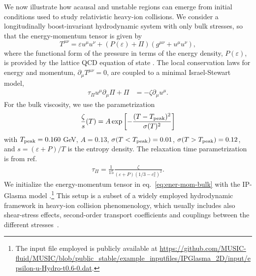 \documentclass[aps, prd, showkeys,superscriptaddress, nofootinbib,floatfix]{revtex4-2}
\begin{document}
We now illustrate how acausal and unstable regions can emerge from initial conditions used to study relativistic heavy-ion collisions.
We consider a longitudinally boost-invariant hydrodynamic system with only bulk stresses, so that the energy-momentum tensor is given by
%
\begin{equation}
\label{eq:ener-mom-bulk}
    T^{\mu \nu} = \varepsilon u^\mu u^\nu +(P(\varepsilon)+\Pi)(g^{\mu \nu} +  u^\mu u^\nu),
\end{equation}
%
where the functional form of the pressure in terms of the energy density, $P(\varepsilon)$, is provided by the lattice QCD equation of state \cite{HotQCD:2014kol,Bernhard:2018hnz}. 
The local conservation laws for energy and momentum, $\partial_{\mu}T^{\mu \nu} = 0$, are coupled to a minimal Israel-Stewart model, 
\begin{align}
	\label{eq:min_IS-model}
	\tau_\Pi u^\mu \partial_\mu\Pi + \Pi &= -\zeta\partial_\mu u^\mu.
\end{align}   
%
%
For the bulk viscosity, we use the parametrization~\cite{Schenke:2020mbo}
\begin{align*}
\frac{\zeta}{s}(T) = A \exp\left[-\frac{(T - T_{\rm peak})^{2}}{\sigma(T)^{2}}\right]
\end{align*}
with $T_{\rm peak} = 0.160$ GeV,  $A = 0.13$, $\sigma(T < T_{\rm peak}) = 0.01$, $\sigma(T > T_{\rm peak}) = 0.12$, and $s = (\varepsilon + P)/T$ is the entropy density. The relaxation time parametrization is from ref.~\cite{Denicol:2014vaa}
\begin{align*}
\tau_{\Pi} = \frac{1}{15}\frac{\zeta}{(\varepsilon + P)(1/3 - c_{s}^{2})^{2}}.  
\end{align*}
We initialize the energy-momentum tensor in eq.~\eqref{eq:ener-mom-bulk} with the IP-Glasma model \cite{Schenke:2012wb,Schenke:2012hg}.\footnote{The input file employed is publicly available at \url{https://github.com/MUSIC-fluid/MUSIC/blob/public_stable/example_inputfiles/IPGlasma_2D/input/epsilon-u-Hydro-t0.6-0.dat}.} This setup is a subset of a widely employed hydrodynamic framework in heavy-ion collision phenomenology, which usually includes also shear-stress effects, second-order transport coefficients and couplings between the different stresses~\cite{Romatschke:2017ejr,Jeon:2015dfa,DerradideSouza:2015kpt,Gale:2013da}.
\end{document}
